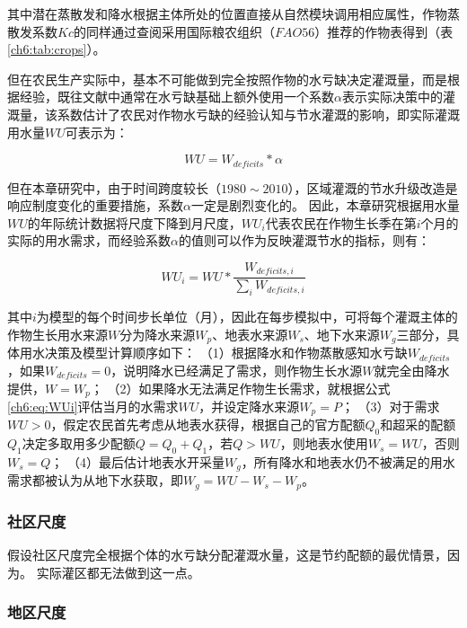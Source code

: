 其中潜在蒸散发和降水根据主体所处的位置直接从自然模块调用相应属性，作物蒸散发系数$Kc$的同样通过查阅采用国际粮农组织（$FAO56$）推荐的作物表得到（表\ref{ch6:tab:crops}）。



但在农民生产实际中，基本不可能做到完全按照作物的水亏缺决定灌溉量，而是根据经验，既往文献中通常在水亏缺基础上额外使用一个系数$\alpha$表示实际决策中的灌溉量，该系数估计了农民对作物水亏缺的经验认知与节水灌溉的影响，即实际灌溉用水量$WU$可表示为：

\begin{equation}
    \label{ch6:eq:WU}
    WU = W_{deficits} * \alpha
\end{equation}

但在本章研究中，由于时间跨度较长（$1980 \sim 2010$），区域灌溉的节水升级改造是响应制度变化的重要措施，系数$\alpha$一定是剧烈变化的。
因此，本章研究根据用水量$WU$的年际统计数据将尺度下降到月尺度，$WU_i$代表农民在作物生长季在第$i$个月的实际的用水需求，而经验系数$\alpha$的值则可以作为反映灌溉节水的指标，则有：

\begin{equation}
    \label{ch6:eq:WUi}
    WU_i = WU * \frac{W_{deficits, i}}{\sum_{i} W_{deficits, i}}
\end{equation}

其中$i$为模型的每个时间步长单位（月），因此在每步模拟中，可将每个灌溉主体的作物生长用水来源$W$分为降水来源$W_p$、地表水来源$W_s$、地下水来源$W_g$三部分，具体用水决策及模型计算顺序如下：
（1）根据降水和作物蒸散感知水亏缺$W_{deficits}$，如果$W_{deficits}=0$，说明降水已经满足了需求，则作物生长水源$W$就完全由降水提供，$W=W_{p}$；
（2）如果降水无法满足作物生长需求，就根据公式\ref{ch6:eq:WUi}评估当月的水需求$WU$，并设定降水来源$W_{p} = P$；
（3）对于需求$WU > 0$，假定农民首先考虑从地表水获得，根据自己的官方配额$Q_{0}$和超采的配额$Q_{1}$决定多取用多少配额$Q = Q_{0} + Q_{1}$，若$Q > WU$，则地表水使用$W_s = WU$，否则$W_s = Q$；
（4）最后估计地表水开采量$W_g$，所有降水和地表水仍不被满足的用水需求都被认为从地下水获取，即$W_g = WU - W_s - W_p$。

\subsubsection*{社区尺度}

假设社区尺度完全根据个体的水亏缺分配灌溉水量，这是节约配额的最优情景，因为。
实际灌区都无法做到这一点。

\subsubsection*{地区尺度}


